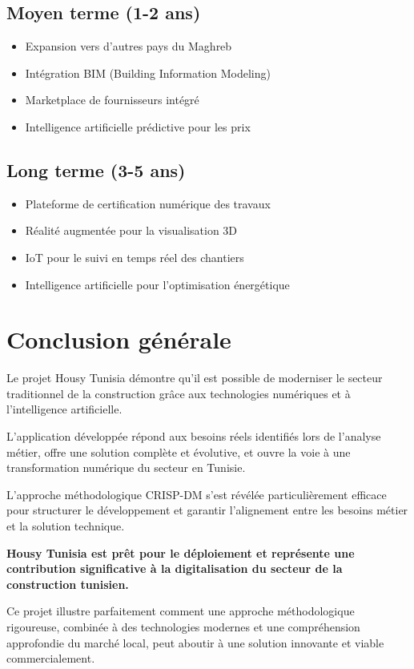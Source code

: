 \documentclass[12pt, a4paper]{report}
\begin{document}
\subsection{Moyen terme (1-2 ans)}

\begin{itemize}
    \item Expansion vers d'autres pays du Maghreb
    \item Intégration BIM (Building Information Modeling)
    \item Marketplace de fournisseurs intégré
    \item Intelligence artificielle prédictive pour les prix
\end{itemize}

\subsection{Long terme (3-5 ans)}

\begin{itemize}
    \item Plateforme de certification numérique des travaux
    \item Réalité augmentée pour la visualisation 3D
    \item IoT pour le suivi en temps réel des chantiers
    \item Intelligence artificielle pour l'optimisation énergétique
\end{itemize}

\section{Conclusion générale}

Le projet Housy Tunisia démontre qu'il est possible de moderniser le secteur traditionnel de la construction grâce aux technologies numériques et à l'intelligence artificielle. 

L'application développée répond aux besoins réels identifiés lors de l'analyse métier, offre une solution complète et évolutive, et ouvre la voie à une transformation numérique du secteur en Tunisie.

L'approche méthodologique CRISP-DM s'est révélée particulièrement efficace pour structurer le développement et garantir l'alignement entre les besoins métier et la solution technique.

\textbf{Housy Tunisia est prêt pour le déploiement et représente une contribution significative à la digitalisation du secteur de la construction tunisien.}

\begin{resultbox}
Ce projet illustre parfaitement comment une approche méthodologique rigoureuse, combinée à des technologies modernes et une compréhension approfondie du marché local, peut aboutir à une solution innovante et viable commercialement.
\end{resultbox}
\end{document}

